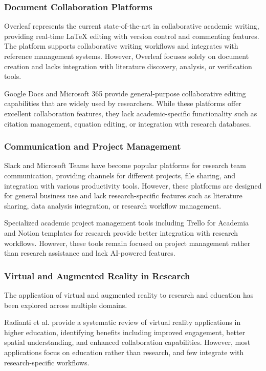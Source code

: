 \documentclass[10pt,twocolumn]{article}
\begin{document}
\subsubsection{Document Collaboration Platforms}

Overleaf \cite{overleaf2019} represents the current state-of-the-art in collaborative academic writing, providing real-time LaTeX editing with version control and commenting features. The platform supports collaborative writing workflows and integrates with reference management systems. However, Overleaf focuses solely on document creation and lacks integration with literature discovery, analysis, or verification tools.

Google Docs and Microsoft 365 provide general-purpose collaborative editing capabilities that are widely used by researchers. While these platforms offer excellent collaboration features, they lack academic-specific functionality such as citation management, equation editing, or integration with research databases.

\subsubsection{Communication and Project Management}

Slack \cite{slack2019} and Microsoft Teams have become popular platforms for research team communication, providing channels for different projects, file sharing, and integration with various productivity tools. However, these platforms are designed for general business use and lack research-specific features such as literature sharing, data analysis integration, or research workflow management.

Specialized academic project management tools including Trello for Academia and Notion templates for research provide better integration with research workflows. However, these tools remain focused on project management rather than research assistance and lack AI-powered features.

\subsubsection{Virtual and Augmented Reality in Research}

The application of virtual and augmented reality to research and education has been explored across multiple domains.

Radianti et al. \cite{radianti2020systematic} provide a systematic review of virtual reality applications in higher education, identifying benefits including improved engagement, better spatial understanding, and enhanced collaboration capabilities. However, most applications focus on education rather than research, and few integrate with research-specific workflows.
\end{document}
